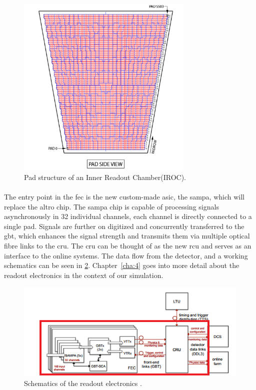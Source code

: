 \documentclass[a4paper, 12pt]{report}
\begin{document}
\begin{figure}[h!]
	\centering
		\includegraphics[width=0.75\textwidth]{images/pad-structure.png}
		\caption[Pad structure of an Inner Readout Chamber(IROC)]{Pad structure of an Inner Readout Chamber(IROC)\cite{pad-structure}.}
		\label{fig:pad-struct}
\end{figure}

\paragraph{}
The entry point in the \gls{fec} is the new custom-made \gls{asic}, the \gls{sampa}, which will replace the \gls{altro} chip\cite{tdr-015}.
The \gls{sampa} chip is capable of processing signals asynchronously in 32 individual channels, each channel is directly connected to a single pad.
Signals are further on digitized and concurrently transferred to the \gls{gbt}, which enhances the signal strength and transmits them via multiple optical fibre links to the \gls{cru}.
The \gls{cru} can be thought of as the new \gls{rcu} and serves as an interface to the online systems.
The data flow from the detector, and a working schematics can be seen in \ref{fig:fec}.
Chapter~\ref{cha:4} goes into more detail about the readout electronics in the context of our simulation.

\begin{figure}[h!]
	\centering
		\includegraphics[width=1.0\textwidth]{images/fec.png}
		\caption[Schematics of the readout electronics]{Schematics of the readout electronics \cite{tdr-016}.}
		\label{fig:fec}
\end{figure}
\end{document}
